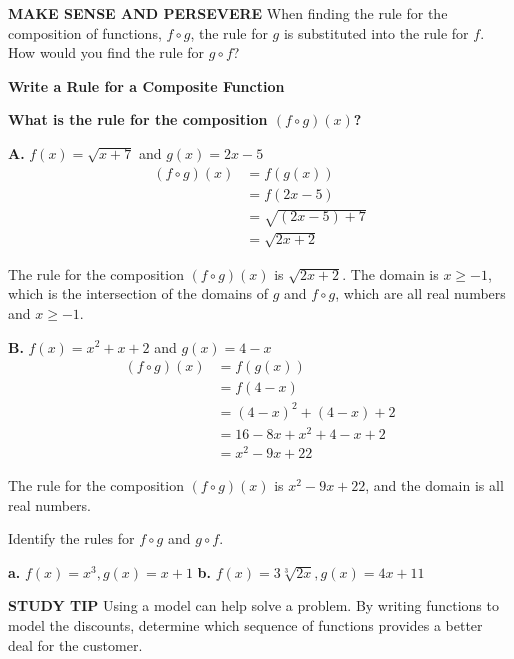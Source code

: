 \documentclass{article}
\newenvironment{example}[1]{}{}
\newenvironment{tryit}[1]{}{}
\begin{document}
\textbf{MAKE SENSE AND PERSEVERE}
When finding the rule for the composition of functions, $f \circ g$, the rule for $g$ is substituted into the rule for $f$. How would you find the rule for $g \circ f$?

\begin{example}{5}
\textbf{Write a Rule for a Composite Function}

\textbf{What is the rule for the composition $(f \circ g)(x)$?}

\textbf{A.} $f(x) = \sqrt{x + 7}$ and $g(x) = 2x - 5$
\begin{align*}
(f \circ g)(x) &= f(g(x)) \\
&= f(2x - 5) \\
&= \sqrt{(2x - 5) + 7} \\
&= \sqrt{2x + 2}
\end{align*}

The rule for the composition $(f \circ g)(x)$ is $\sqrt{2x + 2}$. The domain is $x \geq -1$, which is the intersection of the domains of $g$ and $f \circ g$, which are all real numbers and $x \geq -1$.

\textbf{B.} $f(x) = x^2 + x + 2$ and $g(x) = 4 - x$
\begin{align*}
(f \circ g)(x) &= f(g(x)) \\
&= f(4 - x) \\
&= (4 - x)^2 + (4 - x) + 2 \\
&= 16 - 8x + x^2 + 4 - x + 2 \\
&= x^2 - 9x + 22
\end{align*}

The rule for the composition $(f \circ g)(x)$ is $x^2 - 9x + 22$, and the domain is all real numbers.
\end{example}

\begin{tryit}{5}
Identify the rules for $f \circ g$ and $g \circ f$.

\textbf{a.} $f(x) = x^3, g(x) = x + 1$ \qquad \textbf{b.} $f(x) = 3\sqrt[3]{2x}, g(x) = 4x + 11$
\end{tryit}

\textbf{STUDY TIP}
Using a model can help solve a problem. By writing functions to model the discounts, determine which sequence of functions provides a better deal for the customer.
\end{document}

